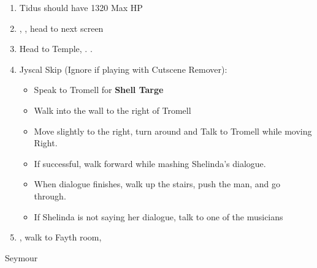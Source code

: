 \begin{enumerate}[resume]
	\item Tidus should have 1320 Max HP
	\item \sd, \cs[0:40], head to next screen
	\item Head to Temple, \sd. \save.
	\wincb
	\item Jyscal Skip (Ignore if playing with Cutscene Remover):
	      \begin{itemize}
		      \item Speak to Tromell for \textbf{Shell Targe}
		      \item Walk into the wall to the right of Tromell
		      \item Move slightly to the right, turn around and Talk to Tromell while moving Right.
		      \item If successful, walk forward while mashing Shelinda's dialogue.
		      \item When dialogue finishes, walk up the stairs, push the man, and go through.
		      \item If Shelinda is not saying her dialogue, talk to one of the musicians
	      \end{itemize}
	\item \sd, walk to Fayth room, \cs[2:10]
\end{enumerate}
\bothvfill
\begin{battle}[3000]{Seymour}
	\begin{itemize}
	\end{itemize}
\end{battle}
\bothvfill
\lossvfill
